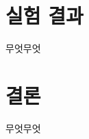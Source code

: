 \documentclass[a4paper, 10pt, nanum]{CSUniSchoolLabReport}
\begin{document}

\section{실험 결과}

	무엇무엇



\section{결론}

	무엇무엇



\end{document}
